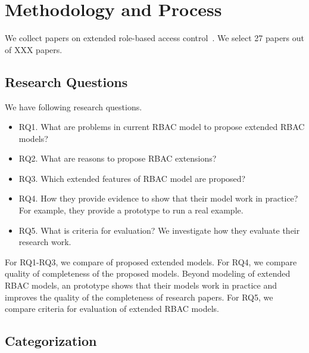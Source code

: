\section{Methodology and Process} \label{sec:process}

We collect papers on extended role-based access control~\cite{ferraiolo:rbac}.
We select 27 papers out of XXX papers.

\subsection{Research Questions} \label{subsec:research questions}
We have following research questions.
\begin{itemize}
	\item RQ1. What are problems in current RBAC model to propose extended RBAC models?
	\item RQ2. What are reasons to propose RBAC extensions? 
	\item RQ3. Which extended features of RBAC model are proposed?
	\item RQ4. How they provide evidence to show that their model work in practice? For example, they provide a prototype to run a real example.
	\item RQ5. What is criteria for evaluation? We investigate how they evaluate their research work. 
	
\end{itemize}

For RQ1-RQ3, we compare of proposed extended models.
For RQ4, we compare quality of completeness of the proposed models.
Beyond modeling of extended RBAC models, an prototype shows that their models work in practice and improves the quality
of the completeness of research papers. For RQ5, we compare criteria for evaluation of extended RBAC models.

\subsection{Categorization} \label{subsec:categorization}

